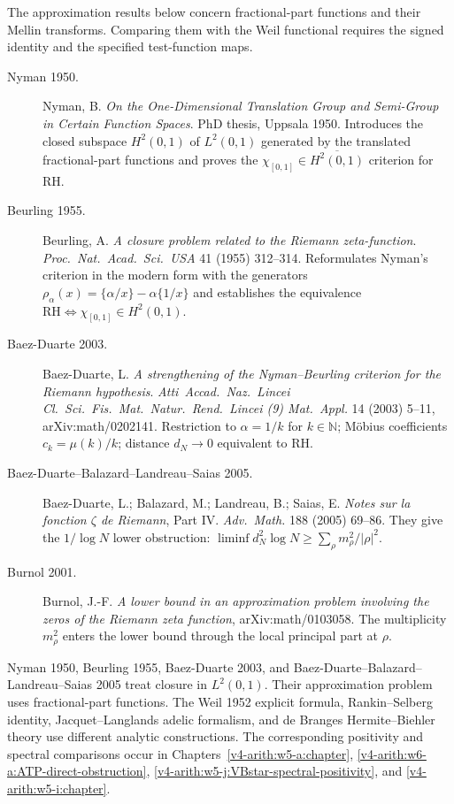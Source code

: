 The approximation results below concern fractional-part functions
and their Mellin transforms. Comparing them with the Weil functional
requires the signed identity and the specified test-function maps.

\begin{description}
\item[Nyman 1950.] Nyman, B. \emph{On the One-Dimensional Translation
Group and Semi-Group in Certain Function Spaces}. PhD thesis, Uppsala
1950. Introduces the closed subspace \(H^{2}(0,1)\) of \(L^{2}(0,1)\)
generated by the translated fractional-part functions and proves the
\(\chi_{[0,1]}\in\overline{H^{2}(0,1)}\) criterion for RH.
\item[Beurling 1955.] Beurling, A. \emph{A closure problem related
to the Riemann zeta-function}. \emph{Proc.~Nat.~Acad.~Sci.~USA} 41
(1955) 312--314. Reformulates Nyman's criterion in the modern form
with the generators \(\rho_{\alpha}(x)=\{\alpha/x\}-\alpha\{1/x\}\) and
establishes the equivalence \(\mathrm{RH}\Leftrightarrow \chi_{[0,1]}\in
H^{2}(0,1)\).
\item[Baez-Duarte 2003.] Baez-Duarte, L. \emph{A strengthening of
the Nyman--Beurling criterion for the Riemann hypothesis}.
\emph{Atti~Accad.~Naz.~Lincei Cl.~Sci.~Fis.~Mat.~Natur.~Rend.~Lincei
(9) Mat.~Appl.} 14 (2003) 5--11, arXiv:math/0202141. Restriction to
\(\alpha=1/k\) for \(k\in\mathbb{N}\); M\"{o}bius coefficients
\(c_{k}=\mu(k)/k\); distance \(d_{N}\to 0\) equivalent to RH.
\item[Baez-Duarte--Balazard--Landreau--Saias 2005.] Baez-Duarte, L.;
Balazard, M.; Landreau, B.; Saias, E. \emph{Notes sur la fonction
\(\zeta\) de Riemann}, Part IV. \emph{Adv.~Math.} 188 (2005) 69--86.
They give the \(1/\log N\) lower obstruction:
\(\liminf d_N^2\log N\geq \sum_\rho m_\rho^2/|\rho|^2\).
\item[Burnol 2001.] Burnol, J.-F. \emph{A lower bound in an approximation
problem involving the zeros of the Riemann zeta function},
arXiv:math/0103058. The multiplicity \(m_\rho^2\) enters the lower
bound through the local principal part at \(\rho\).
\end{description}

Nyman 1950, Beurling 1955, Baez-Duarte 2003, and
Baez-Duarte--Balazard--Landreau--Saias 2005 treat closure in
\(L^2(0,1)\). Their approximation problem uses fractional-part
functions. The Weil 1952 explicit formula, Rankin--Selberg identity,
Jacquet--Langlands adelic formalism, and de Branges
Hermite--Biehler theory use different analytic constructions.
The corresponding positivity and spectral comparisons occur in
Chapters~\ref{v4-arith:w5-a:chapter},
\ref{v4-arith:w6-a:ATP-direct-obstruction},
\ref{v4-arith:w5-j:VBstar-spectral-positivity}, and
\ref{v4-arith:w5-i:chapter}.


